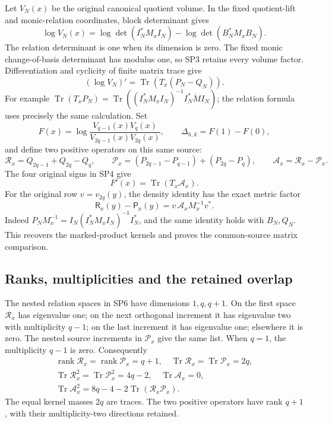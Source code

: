 Let \(V_N(x)\) be the original canonical quotient volume. In the
fixed quotient-lift and monic-relation coordinates, block determinant
gives
\[
 \log V_N(x)=\log\det(I_N^*M_xI_N)
                  -\log\det(B_N^*M_xB_N).
 \tag{SP3}
\]
The relation determinant is one when its dimension is zero.
The fixed monic change-of-basis determinant has modulus one, so
SP3 retains every volume factor. Differentiation and cyclicity of
finite matrix trace give
\[
 (\log V_N)'=\operatorname{Tr}(T_x(P_N-Q_N)).
 \tag{SP4}
\]
For example
\(\operatorname{Tr}(T_xP_N)=
\operatorname{Tr}((I_N^*M_xI_N)^{-1}I_N^*\dot M I_N)\);
the relation formula uses precisely the same calculation.
Set
\[
 F(x)=\log\frac{V_{q-1}(x)V_q(x)}
                      {V_{2q-1}(x)V_{2q}(x)},\qquad
 \Delta_{h,k}=F(1)-F(0),
 \tag{SP5}
\]
and define two positive operators on this same source:
\[
 \mathcal R_x=Q_{2q-1}+Q_{2q}-Q_q,\qquad
 \mathcal P_x=(P_{2q-1}-P_{q-1})+(P_{2q}-P_q),\qquad
 \mathcal A_x=\mathcal R_x-\mathcal P_x .
 \tag{SP6}
\]
The four original signs in SP4 give
\[
                  F'(x)=\operatorname{Tr}(T_x\mathcal A_x).
 \tag{SP7}
\]
For the original row \(v=v_{2q}(y)\), the density identity has the exact
metric factor
\[
 \mathsf R_x(y)-\mathsf P_x(y)=v\,\mathcal A_xM_x^{-1}v^* .
\]
Indeed \(P_NM_x^{-1}=I_N(I_N^*M_xI_N)^{-1}I_N^*\),
and the same identity holds with \(B_N,Q_N\). This recovers the
marked-product kernels and proves the common-source matrix comparison.

\subsection{Ranks, multiplicities and the retained overlap}
The nested relation spaces in SP6 have dimensions \(1,q,q+1\).
On the first space \(\mathcal R_x\) has eigenvalue one; on the next
orthogonal increment it has eigenvalue two with multiplicity \(q-1\);
on the last increment it has eigenvalue one; elsewhere it is zero.
The nested source increments in \(\mathcal P_x\) give the same list.
When \(q=1\), the multiplicity \(q-1\) is zero. Consequently
\[
 \begin{gathered}
 \operatorname{rank}\mathcal R_x=\operatorname{rank}\mathcal P_x=q+1,
 \quad
 \operatorname{Tr}\mathcal R_x=\operatorname{Tr}\mathcal P_x=2q,\\
 \operatorname{Tr}\mathcal R_x^2
       =\operatorname{Tr}\mathcal P_x^2=4q-2,\quad
 \operatorname{Tr}\mathcal A_x=0,\\
 \operatorname{Tr}\mathcal A_x^2
       =8q-4-2\operatorname{Tr}(\mathcal R_x\mathcal P_x).
 \end{gathered}
 \tag{SP8}
\]
The equal kernel masses \(2q\) are traces. The two positive operators
have rank \(q+1\), with their multiplicity-two directions retained.

